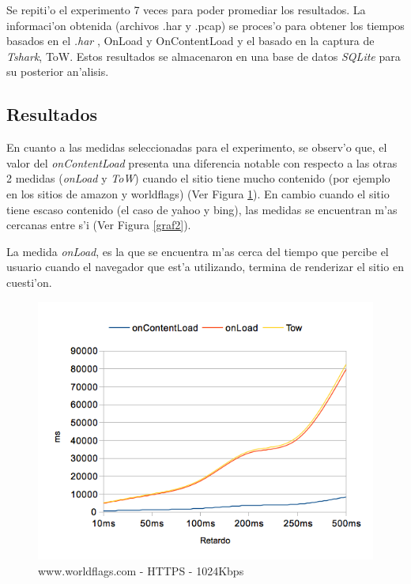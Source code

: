 \documentclass[a4paper,11pt,twocolumn]{article}
\begin{document}
Se repiti'o el experimento 7 veces para poder promediar los resultados. La informaci'on obtenida (archivos .har y .pcap) se proces'o para obtener los tiempos basados en el \emph{.har} \cite{harSpec}, OnLoad y OnContentLoad y el basado en la captura de \emph{Tshark}, ToW. Estos resultados se almacenaron en una base de datos \emph{SQLite} \cite{SQLite} para su posterior an'alisis.

\subsection{Resultados}

En cuanto a las medidas seleccionadas para el experimento, se observ'o que, el valor del \emph{onContentLoad} presenta una diferencia notable con respecto a las otras 2 medidas (\emph{onLoad} y \emph{ToW}) cuando el sitio tiene mucho contenido (por ejemplo en los sitios de amazon y worldflags) (Ver Figura \ref{graf1}). En cambio cuando el sitio tiene escaso contenido (el caso de yahoo y bing), las medidas se encuentran m'as cercanas entre s'i (Ver Figura \ref{graf2}).

La medida \emph{onLoad}, es la que se encuentra m'as cerca del tiempo que percibe el usuario cuando el navegador que est'a utilizando, termina de renderizar el sitio en cuesti'on.

\begin{figure}[h!]
  	\centering
	\includegraphics[scale=0.65]{exp1_1}
	\caption{\small www.worldflags.com - HTTPS - 1024Kbps}
	\label{graf1}
\end{figure}
\end{document}
